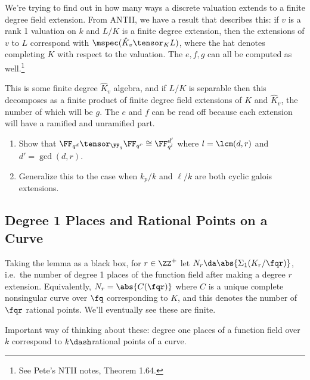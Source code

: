 We're trying to find out in how many ways a discrete valuation extends
to a finite degree field extension. From ANTII, we have a result that
describes this: if \(v\) is a rank 1 valuation on \(k\) and \(L/K\) is a
finite degree extension, then the extensions of \(v\) to \(L\)
correspond with \(\mspec(\hat{K}_v \tensor_K L)\), where the hat denotes
completing \(K\) with respect to the valuation. The \(e,f,g\) can all be
computed as well.\footnote{See Pete's NTII notes, Theorem 1.64.}

This is some finite degree \(\hat{K}_v\) algebra, and if \(L/K\) is
separable then this decomposes as a finite product of finite degree
field extensions of \(K\) and \(\hat{K}_v\), the number of which will be
\(g\). The \(e\) and \(f\) can be read off because each extension will
have a ramified and unramified part.

\begin{exercise}[?]

\envlist

\begin{enumerate}
\def\labelenumi{\alph{enumi}.}
\item
  Show that \(\FF_{q^d} \tensor_{\FF_q} \FF_{q^r} \cong \FF_{q^l}^{d'}\)
  where \(l = \lcm(d, r)\) and \(d' = \gcd(d, r)\).
\item
  Generalize this to the case when \(k_p / k\) and \(\ell / k\) are both
  cyclic galois extensions.
\end{enumerate}

\end{exercise}

\hypertarget{degree-1-places-and-rational-points-on-a-curve}{%
\subsection{Degree 1 Places and Rational Points on a
Curve}\label{degree-1-places-and-rational-points-on-a-curve}}

Taking the lemma as a black box, for \(r\in \ZZ^+\) let
\(N_r \da \abs{\Sigma_1(K_r/ \fqr) }\), i.e.~the number of degree 1
places of the function field after making a degree \(r\) extension.
Equivalently, \(N_r = \abs{C(\fqr)}\) where \(C\) is a unique complete
nonsingular curve over \(\fq\) corresponding to \(K\), and this denotes
the number of \(\fqr\) rational points. We'll eventually see these are
finite.

\begin{remark}

Important way of thinking about these: degree one places of a function
field over \(k\) correspond to \(k\dash\)rational points of a curve.

\end{remark}

